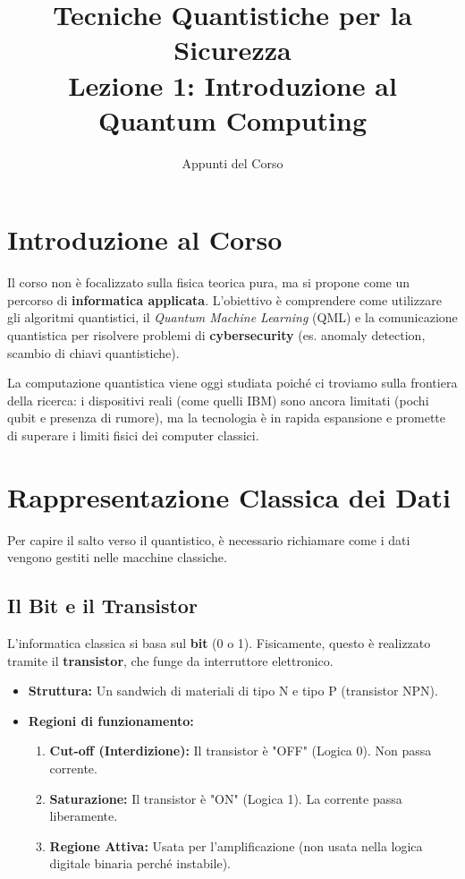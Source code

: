 \documentclass[12pt, a4paper]{article}
\title{\textbf{Tecniche Quantistiche per la Sicurezza}\\ \large Lezione 1: Introduzione al Quantum Computing}
\author{Appunti del Corso}
\date{}
\begin{document}
\maketitle

\section{Introduzione al Corso}
Il corso non è focalizzato sulla fisica teorica pura, ma si propone come un percorso di \textbf{informatica applicata}. L'obiettivo è comprendere come utilizzare gli algoritmi quantistici, il \textit{Quantum Machine Learning} (QML) e la comunicazione quantistica per risolvere problemi di \textbf{cybersecurity} (es. anomaly detection, scambio di chiavi quantistiche).

La computazione quantistica viene oggi studiata poiché ci troviamo sulla frontiera della ricerca: i dispositivi reali (come quelli IBM) sono ancora limitati (pochi qubit e presenza di rumore), ma la tecnologia è in rapida espansione e promette di superare i limiti fisici dei computer classici.

\section{Rappresentazione Classica dei Dati}
Per capire il salto verso il quantistico, è necessario richiamare come i dati vengono gestiti nelle macchine classiche.

\subsection{Il Bit e il Transistor}
L'informatica classica si basa sul \textbf{bit} (0 o 1). Fisicamente, questo è realizzato tramite il \textbf{transistor}, che funge da interruttore elettronico.
\begin{itemize}
    \item \textbf{Struttura:} Un sandwich di materiali di tipo N e tipo P (transistor NPN).
    \item \textbf{Regioni di funzionamento:}
    \begin{enumerate}
        \item \textbf{Cut-off (Interdizione):} Il transistor è "OFF" (Logica 0). Non passa corrente.
        \item \textbf{Saturazione:} Il transistor è "ON" (Logica 1). La corrente passa liberamente.
        \item \textbf{Regione Attiva:} Usata per l'amplificazione (non usata nella logica digitale binaria perché instabile).
    \end{enumerate}
\end{itemize}
\end{document}
